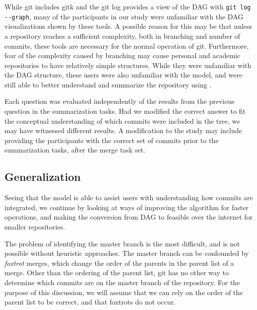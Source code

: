 

While git includes gitk and the git log provides a view of the DAG with
\verb|git log --graph|, many of the participants in our study were
unfamiliar with the DAG visualizations shown by these tools. A possible
reason for this may be that unless a repository reaches a sufficient
complexity, both in branching and number of commits, these tools are
necessary for the normal operation of git. Furthermore, fear of the
complexity caused by branching may cause personal and academic
repositories to have relatively simple structures. While they were
unfamiliar with the DAG structure, these users were also unfamiliar with
the \mt model, and were still able to better understand and summarize
the repository using \tool.

Each question was evaluated independently of the results from the
previous question in the summarization tasks. Had we modified the
correct answer to fit the conceptual understanding of which commits were
included in the tree, we may have witnessed different results. A
modification to the study may include providing the participants with
the correct set of commits prior to the summarization tasks, after the
merge task set.

\subsection{Generalization}
\label{sub:generalization}

Seeing that the \mt model is able to assist users with understanding how
commits are integrated, we continue by looking at ways of improving the
algorithm for faster operations, and making the conversion from DAG to
\mt feasible over the internet for smaller repositories.

The problem of identifying the master branch is the most difficult, and is
not possible without heuristic approaches. The master branch can be
confounded by \textit{foxtrot} merges, which change the order of the
parents in the parent list of a merge. Other than the ordering of the
parent list, git has no other way to determine which commits are on the
master branch of the repository. For the purpose of this discussion, we
will assume that we can rely on the order of the parent list to be
correct, and that foxtrots do not occur.

